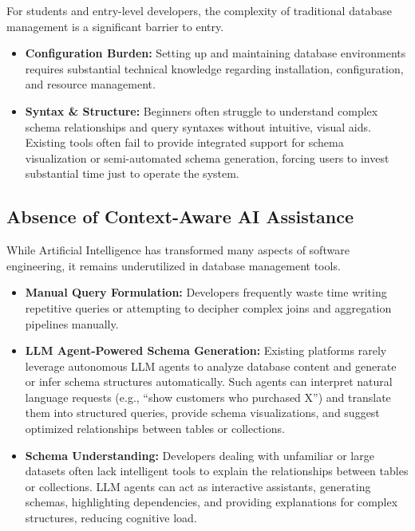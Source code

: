 For students and entry-level developers, the complexity of traditional database management is a significant barrier to entry.

\begin{itemize}
    \item \textbf{Configuration Burden:} Setting up and maintaining database environments requires substantial technical knowledge regarding installation, configuration, and resource management.
    \item \textbf{Syntax \& Structure:} Beginners often struggle to understand complex schema relationships and query syntaxes without intuitive, visual aids. Existing tools often fail to provide integrated support for schema visualization or semi-automated schema generation, forcing users to invest substantial time just to operate the system.
\end{itemize}

\subsection{Absence of Context-Aware AI Assistance}

While Artificial Intelligence has transformed many aspects of software engineering, it remains underutilized in database management tools.

\begin{itemize}
    \item \textbf{Manual Query Formulation:} Developers frequently waste time writing repetitive queries or attempting to decipher complex joins and aggregation pipelines manually.
    \item \textbf{LLM Agent-Powered Schema Generation:} Existing platforms rarely leverage autonomous LLM agents to analyze database content and generate or infer schema structures automatically. Such agents can interpret natural language requests (e.g., ``show customers who purchased X'') and translate them into structured queries, provide schema visualizations, and suggest optimized relationships between tables or collections.
    \item \textbf{Schema Understanding:} Developers dealing with unfamiliar or large datasets often lack intelligent tools to explain the relationships between tables or collections. LLM agents can act as interactive assistants, generating schemas, highlighting dependencies, and providing explanations for complex structures, reducing cognitive load.
\end{itemize}

